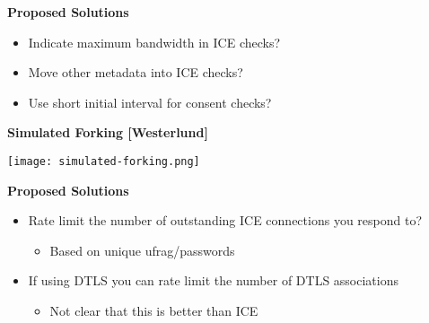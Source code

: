 \documentclass[helvetica]{seminar}
\newcommand{\heading}[1]{%
  \begin{center} 
    \large\bf 
    #1 
  \end{center} 
  \vspace{.4 in}}
\begin{document}
\begin{slide}
\heading{Proposed Solutions}

\begin{itemize}
\item Indicate maximum bandwidth in ICE checks?
\item Move other metadata into ICE checks?
\item Use short initial interval for consent checks?
\end{itemize}

\end{slide}


\begin{slide}
\heading{Simulated Forking [Westerlund]}

{\centering
\noindent\texttt{[image: simulated-forking.png]}
}

\end{slide}


\begin{slide}
\heading{Proposed Solutions}

\begin{itemize}
\item Rate limit the number of outstanding ICE connections you respond to?
  \begin{itemize}
  \item Based on unique ufrag/passwords
  \end{itemize}

\item If using DTLS you can rate limit the number of DTLS associations
  \begin{itemize}
  \item Not clear that this is better than ICE
  \end{itemize}
\end{itemize}
\end{slide}
\end{document}
